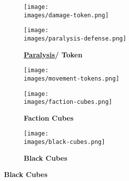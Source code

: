 \begin{figure}[H]
  \centering
  \begin{subfigure}[b]{0.2\linewidth}
    \caption{\textbf{}}
  \end{subfigure}
  \begin{subfigure}[b]{0.1\linewidth}
    \centering
    \texttt{[image: \\images/damage-token.png]}
    \caption{\textbf{}}
  \end{subfigure}
  \begin{subfigure}[b]{0.17\linewidth}
    \centering
    \texttt{[image: \\images/paralysis-defense.png]}
    \caption{\textbf{\hyperlink{Paralysis}{Paralysis}/  Token}}
  \end{subfigure}
  \begin{subfigure}[b]{0.15\linewidth}
    \centering
    \texttt{[image: \\images/movement-tokens.png]}
    \caption{\textbf{}}
  \end{subfigure}
  \begin{subfigure}[b]{0.15\linewidth}
    \centering
    \texttt{[image: \\images/faction-cubes.png]}
    \caption{\textbf{Faction Cubes}}
  \end{subfigure}
  \begin{subfigure}[b]{0.15\linewidth}
    \centering
    \texttt{[image: \\images/black-cubes.png]}
    \caption{\textbf{Black Cubes}}
  \end{subfigure}
\end{figure}
\vspace*{-2em}
